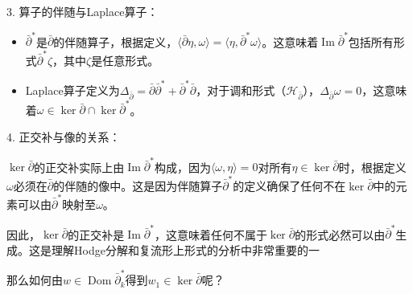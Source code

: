 \documentclass[lang=cn,zihao=-4,a4paper,fontset=none]{beautybook}
\begin{document}
3. 算子的伴随与Laplace算子：
\begin{itemize}
   \item $\bar{\partial}^*$是$\bar{\partial}$的伴随算子，根据定义，$\langle \bar{\partial} \eta, \omega \rangle = \langle \eta, \bar{\partial}^* \omega \rangle$。这意味着$\operatorname{Im} \bar{\partial}^*$包括所有形式$\bar{\partial}^* \zeta$，其中$\zeta$是任意形式。
   \item Laplace算子定义为$\Delta_{\bar{\partial}} = \bar{\partial}\bar{\partial}^* + \bar{\partial}^*\bar{\partial}$，对于调和形式（$\mathcal{H}_{\bar{\partial}}$），$\Delta_{\bar{\partial}} \omega = 0$，这意味着$\omega \in \ker \bar{\partial} \cap \ker \bar{\partial}^*$。
\end{itemize}

4. 正交补与像的关系：

    $\ker \bar{\partial}$的正交补实际上由$\operatorname{Im} \bar{\partial}^*$构成，因为$\langle \omega, \eta \rangle = 0$对所有$\eta \in \ker \bar{\partial}$时，根据定义$\omega$必须在$\bar{\partial}$的伴随的像中。这是因为伴随算子$\bar{\partial}^*$的定义确保了任何不在$\ker \bar{\partial}$中的元素可以由$\bar{\partial}^*$映射至$\omega$。

因此，$\ker \bar{\partial}$的正交补是$\operatorname{Im} \bar{\partial}^*$，这意味着任何不属于$\ker \bar{\partial}$的形式必然可以由$\bar{\partial}^*$生成。这是理解Hodge分解和复流形上形式的分析中非常重要的一

\begin{proposition}
    那么如何由$w\in \operatorname{Dom} \bar\partial^*_k$得到$w_1\in \ker \bar\partial$呢？
\end{proposition}
    
\end{document}
